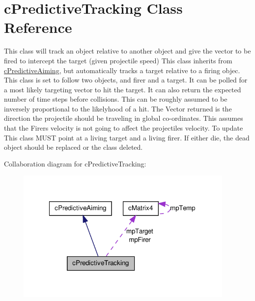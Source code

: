 \hypertarget{classc_predictive_tracking}{
\section{cPredictiveTracking Class Reference}
\label{classc_predictive_tracking}
}


This class will track an object relative to another object and give the vector to be fired to intercept the target (given projectile speed) This class inherits from \hyperlink{classc_predictive_aiming}{cPredictiveAiming}, but automatically tracks a target relative to a firing objec. This class is set to follow two objects, and firer and a target. It can be polled for a most likely targeting vector to hit the target. It can also return the expected number of time steps before collisions. This can be roughly assumed to be inversely proportional to the likelyhood of a hit. The Vector returned is the direction the projectile should be traveling in global co-\/ordinates. This assumes that the Firers velocity is not going to affect the projectiles velocity. To update This class MUST point at a living target and a living firer. If either die, the dead object should be replaced or the class deleted.  




Collaboration diagram for cPredictiveTracking:\nopagebreak
\begin{figure}[H]
\begin{center}
\leavevmode
\includegraphics[width=303pt]{classc_predictive_tracking__coll__graph}
\end{center}
\end{figure}
